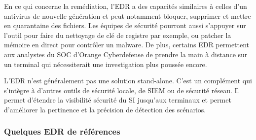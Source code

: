 En ce qui concerne la remédiation, l’EDR a des capacités similaires à celles d’un antivirus de nouvelle génération et peut notamment bloquer, supprimer et mettre en quarantaine des fichiers. Les équipes de sécurité pourront aussi s’appuyer sur l’outil pour faire du nettoyage de clé de registre par exemple, ou patcher la mémoire en direct pour contrôler un malware.  De plus, certains EDR permettent aux analystes du SOC d’Orange Cyberdefense de prendre la main à distance sur un terminal qui nécessiterait une investigation plus poussée encore.

L’EDR n’est généralement pas une solution stand-alone. C’est un  complément qui s’intègre à d'autres outils de sécurité locale, de SIEM ou de sécurité réseau. Il permet d’étendre la visibilité sécurité du SI jusqu’aux terminaux et permet d'améliorer la pertinence et la précision de détection des scénarios.

\subsubsection{Quelques EDR de références}

